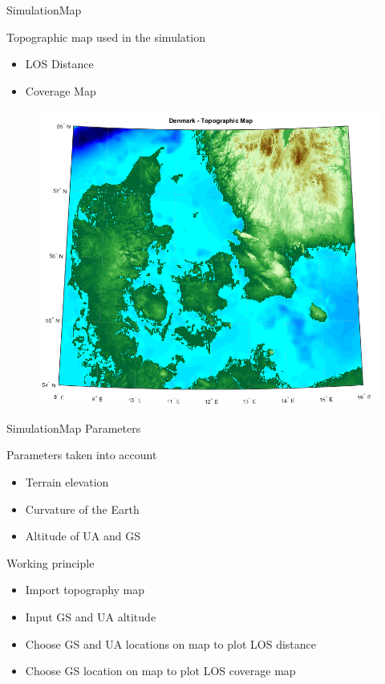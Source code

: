 
\begin{frame}{Simulation}{Map}
  \begin{block}{Topographic map used in the simulation}
  	\begin{itemize}
	 	\item LOS Distance
	  	\item Coverage Map
	\end{itemize}
	\begin{figure}
    	\includegraphics[scale=0.28]{../report/figures/dk_map.png}
    \end{figure}
  \end{block}
\end{frame}

\begin{frame}{Simulation}{Map Parameters}
  \begin{block}{Parameters taken into account}
	\begin{itemize}
	 	\item Terrain elevation
	  	\item Curvature of the Earth
	  	\item Altitude of UA and GS
	\end{itemize}
  \end{block}
  \begin{block}{Working principle}
	  \begin{itemize}
	  	\item Import topography map
	  	\item Input GS and UA altitude
	  	\item Choose GS and UA locations on map to plot LOS distance
	  	\item Choose GS location on map to plot LOS coverage map
	  \end{itemize}
  \end{block}
\end{frame}

